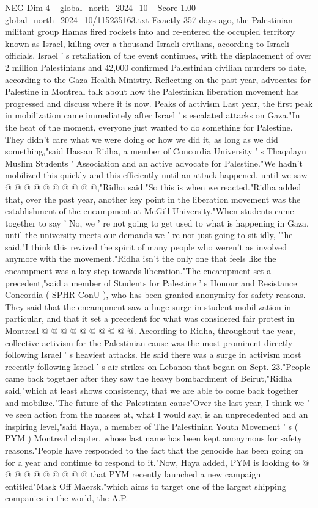 \begin{textsample}{NEG Dim 4 – global\_north\_2024\_10 – Score 1.00 – global\_north\_2024\_10/115235163.txt}  \label{ex:f4_neg_060}
Exactly 357 days ago, the Palestinian militant group Hamas fired rockets into and re-entered the occupied territory known as Israel, killing over a thousand Israeli civilians, according to Israeli officials.
Israel ' s retaliation of the event continues, with the displacement of over 2 million Palestinians and 42,000 confirmed Palestinian civilian murders to date, according to the Gaza Health Ministry.
Reflecting on the past year, advocates for Palestine in Montreal talk about how the Palestinian liberation movement has progressed and discuss where it is now.
Peaks of activism Last year, the first peak in mobilization came immediately after Israel ' s escalated attacks on Gaza."In the heat of the moment, everyone just wanted to do something for Palestine.
They didn't care what we were doing or how we did it, as long as we did something,"said Hassan Ridha, a member of Concordia University ' s Thaqalayn Muslim Students ' Association and an active advocate for Palestine."We hadn't mobilized this quickly and this efficiently until an attack happened, until we saw @ @ @ @ @ @ @ @ @ @,"Ridha said."So this is when we reacted."Ridha added that, over the past year, another key point in the liberation movement was the establishment of the encampment at McGill University."When students came together to say ' No, we ' re not going to get used to what is happening in Gaza, until the university meets our demands we ' re not just going to sit idly, '"he said,"I think this revived the spirit of many people who weren't as involved anymore with the movement."Ridha isn't the only one that feels like the encampment was a key step towards liberation."The encampment set a precedent,"said a member of Students for Palestine ' s Honour and Resistance Concordia ( SPHR ConU ), who has been granted anonymity for safety reasons.
They said that the encampment saw a huge surge in student mobilization in particular, and that it set a precedent for what was considered fair protest in Montreal @ @ @ @ @ @ @ @ @ @.
According to Ridha, throughout the year, collective activism for the Palestinian cause was the most prominent directly following Israel ' s heaviest attacks.
He said there was a surge in activism most recently following Israel ' s air strikes on Lebanon that began on Sept. 23."People came back together after they saw the heavy bombardment of Beirut,"Ridha said,"which at least shows consistency, that we are able to come back together and mobilize."The future of the Palestinian cause"Over the last year, I think we ' ve seen action from the masses at, what I would say, is an unprecedented and an inspiring level,"said Haya, a member of The Palestinian Youth Movement ' s ( PYM ) Montreal chapter, whose last name has been kept anonymous for safety reasons."People have responded to the fact that the genocide has been going on for a year and continue to respond to it."Now, Haya added, PYM is looking to @ @ @ @ @ @ @ @ @ @ that PYM recently launched a new campaign entitled"Mask Off Maersk."which aims to target one of the largest shipping companies in the world, the A.P.

\end{textsample}
